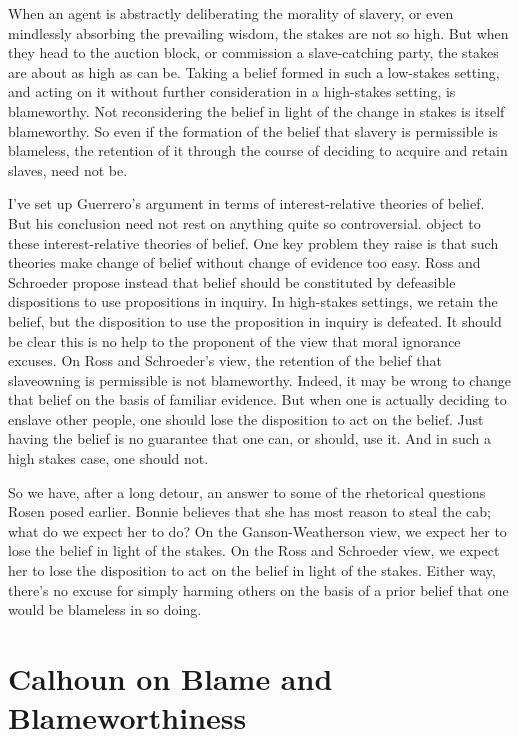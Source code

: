 When an agent is abstractly deliberating the morality of slavery, or even mindlessly absorbing the prevailing wisdom, the stakes are not so high. But when they head to the auction block, or commission a slave-catching party, the stakes are about as high as can be. Taking a belief formed in such a low-stakes setting, and acting on it without further consideration in a high-stakes setting, is blameworthy. Not reconsidering the belief in light of the change in stakes is itself blameworthy. So even if the formation of the belief that slavery is permissible is blameless, the retention of it through the course of deciding to acquire and retain slaves, need not be.

I've set up Guerrero's argument in terms of interest-relative theories of belief. But his conclusion need not rest on anything quite so controversial. \citet{SchroederRoss2014} object to these interest-relative theories of belief. One key problem they raise is that such theories make change of belief without change of evidence too easy. Ross and Schroeder propose instead that belief should be constituted by defeasible dispositions to use propositions in inquiry. In high-stakes settings, we retain the belief, but the disposition to use the proposition in inquiry is defeated. It should be clear this is no help to the proponent of the view that moral ignorance excuses. On Ross and Schroeder's view, the retention of the belief that slaveowning is permissible is not blameworthy. Indeed, it may be wrong to change that belief on the basis of familiar evidence. But when one is actually deciding to enslave other people, one should lose the disposition to act on the belief. Just having the belief is no guarantee that one can, or should, use it. And in such a high stakes case, one should not.

So we have, after a long detour, an answer to some of the rhetorical questions Rosen posed earlier. \gls{Bonnie} believes that she has most reason to steal the cab; what do we expect her to do? On the Ganson-Weatherson view, we expect her to lose the belief in light of the stakes. On the Ross and Schroeder view, we expect her to lose the disposition to act on the belief in light of the stakes. Either way, there's no excuse for simply harming others on the basis of a prior belief that one would be blameless in so doing.

\section{Calhoun on Blame and Blameworthiness}
\label{calhounonblameandblameworthiness}

